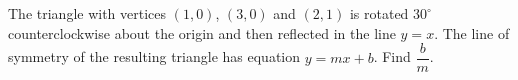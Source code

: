 The triangle with vertices $(1,0)$, $(3,0)$ and $(2,1)$ is rotated $30^\circ$ counterclockwise about the origin and then reflected in the line $y=x$. The line of symmetry of the resulting triangle has equation $y=mx+b$. Find $\dfrac bm$.
